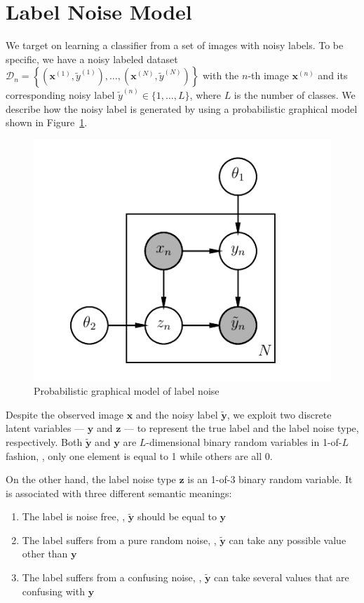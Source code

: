 \documentclass[10pt,twocolumn,letterpaper]{article}
\def\vec{\mathbf}
\begin{document}
\section{Label Noise Model} %
\label{sec:label_noise_model}
We target on learning a classifier from a set of images with noisy labels. To be specific, we have a noisy labeled dataset $\mathcal{D}_n=\left\{\left(\vec{x}^{(1)}, \tilde{y}^{(1)}\right), \dots, \left(\vec{x}^{(N)}, \tilde{y}^{(N)}\right)\right\}$ with the $n$-th image $\vec{x}^{(n)}$ and its corresponding noisy label $\tilde{y}^{(n)} \in \{1,\dots,L\}$, where $L$ is the number of classes. We describe how the noisy label is generated by using a probabilistic graphical model shown in Figure~\ref{fig:noise_pgm}.

\begin{figure}[h!]
\begin{center}
\includegraphics[width=0.5\linewidth]{figure/pgm.pdf}
\end{center}
\caption{Probabilistic graphical model of label noise}
\label{fig:noise_pgm}
\end{figure}

Despite the observed image $\vec{x}$ and the noisy label $\tilde{\vec{y}}$, we exploit two discrete latent variables --- $\vec{y}$ and $\vec{z}$ --- to represent the true label and the label noise type, respectively. Both $\tilde{\vec{y}}$ and $\vec{y}$ are $L$-dimensional binary random variables in 1-of-$L$ fashion, \ie, only one element is equal to 1 while others are all 0.

On the other hand, the label noise type $\vec{z}$ is an 1-of-3 binary random variable. It is associated with three different semantic meanings:
\begin{enumerate}
    \item The label is noise free, \ie, $\tilde{\vec{y}}$ should be equal to $\vec{y}$
    \item The label suffers from a pure random noise, \ie, $\tilde{\vec{y}}$ can take any possible value other than $\vec{y}$
    \item The label suffers from a confusing noise, \ie, $\tilde{\vec{y}}$ can take several values that are confusing with $\vec{y}$
\end{enumerate}
\end{document}
